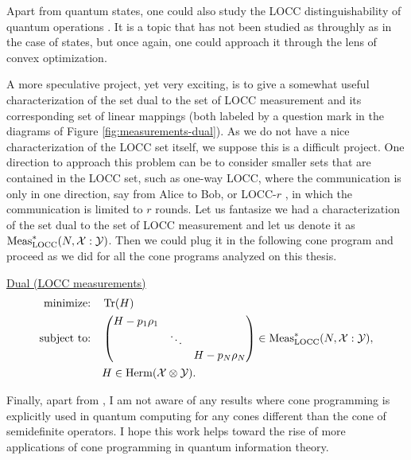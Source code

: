 Apart from quantum states, one could also study the LOCC distinguishability of 
quantum operations \cite{Matthews10}. It is a topic that has not been studied as throughly
as in the case of states, but once again, one could approach it through 
the lens of convex optimization.

A more speculative project, yet very exciting, is to give a somewhat useful 
characterization of the set dual to the set of LOCC measurement and its corresponding
set of linear mappings (both labeled by a question mark in the diagrams of Figure \ref{fig:measurements-dual}).
As we do not have a nice characterization of the LOCC set itself, we suppose
this is a difficult project. One direction to approach this problem
can be to consider smaller sets that are contained in the LOCC set, such as 
one-way LOCC, where the communication is only in one direction, say from
Alice to Bob, or LOCC-$r$ , in which the communication is limited to $r$ rounds.
Let us fantasize we had a characterization of the set dual to the set of LOCC measurement
and let us denote it as $\mathrm{Meas}_{\mathrm{LOCC}}^{\ast}(N, \mathcal{X}:\mathcal{Y})$. Then we could plug it in the 
following cone program and proceed as we did for all the cone programs analyzed 
on this thesis.
\begin{center}
\underline{Dual (LOCC measurements)}
  \begin{equation}
    \label{eq:locc-dual-problem}
    \begin{split}
      \text{minimize:} \quad & \operatorname{Tr}(H)\\
      \text{subject to:}
       \quad & 
        \begin{pmatrix}
            H - p_{1}\rho_{1} & & \\
             & \ddots & \\
             & & H - p_{N}\rho_{N}
       \end{pmatrix}\in \mathrm{Meas}_{\mathrm{LOCC}}^{\ast}(N, \mathcal{X}:\mathcal{Y}),\\
       \quad & H \in \mathrm{Herm}(\mathcal{X}\otimes\mathcal{Y}).
    \end{split}
  \end{equation}
\end{center}

Finally, apart from \cite{Gharibian13}, I am not aware of any results where 
cone programming is explicitly used in quantum computing for any cones different than the 
cone of semidefinite operators. 
I hope this work helps toward the rise of more applications of cone programming
in quantum information theory.
